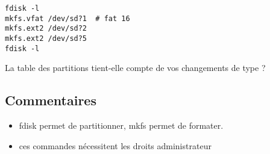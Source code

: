 \begin{lstlisting}
fdisk -l
mkfs.vfat /dev/sd?1  # fat 16
mkfs.ext2 /dev/sd?2
mkfs.ext2 /dev/sd?5
fdisk -l
\end{lstlisting}

La table des partitions tient-elle compte de vos changements de type ?

\subsection{Commentaires}
\begin{itemize}
\item fdisk permet de partitionner, mkfs permet de formater.
\item ces commandes nécessitent les droits administrateur
\end{itemize}

\newpage
